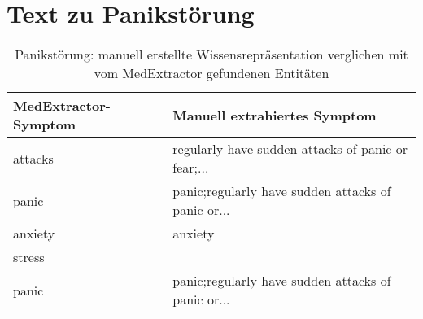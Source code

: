 \section{Text zu Panikstörung}
\label{sec:panicdisorder} 

\begin{table}[H]
\begin{center}
\begin{tabular}{ll}
\toprule
  MedExtractor-Symptom &                       Manuell extrahiertes Symptom \\
\midrule
             attacks & regularly have sudden attacks of panic or fear;... \\
               panic & panic;regularly have sudden attacks of panic or... \\
             anxiety &                                            anxiety \\
              stress &                                                    \\
               panic & panic;regularly have sudden attacks of panic or... \\
\bottomrule
\end{tabular}
\caption{Panikstörung: manuell erstellte Wissensrepräsentation verglichen mit vom MedExtractor gefundenen Entitäten}
\label{tab:panicdisorder_vergleich_manuell_medextractor}
\end{center}
\end{table}


